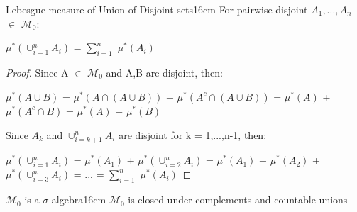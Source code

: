     \vspace{0.5cm}



    \begin{wtheorem}{Lebesgue measure of Union of Disjoint sets}{16cm}
        For pairwise disjoint $A_1,...,A_n$ $\in$ $\mathcal{M}_0$:

        \hspace{0.5cm}
        $\mu^*(\cup_{i=1}^n A_i)$ = $\sum_{i=1}^n$ $\mu^*(A_i)$
    \end{wtheorem}

    \begin{proof}
        Since A $\in$ $\mathcal{M}_0$ and A,B are disjoint, then:

        \hspace{0.5cm}
        $\mu^*(A \cup B)$
        = $\mu^*(A \cap (A \cup B))$ + $\mu^*(A^c \cap (A \cup B))$
        = $\mu^*(A)$ + $\mu^*(A^c \cap B)$
        = $\mu^*(A)$ + $\mu^*(B)$

        Since $A_k$ and $\cup_{i=k+1}^n A_i$ are disjoint
        for k = 1,...,n-1, then:

        \hspace{0.5cm}
        $\mu^*(\cup_{i=1}^n A_i)$
        = $\mu^*(A_1)$ + $\mu^*(\cup_{i=2}^n A_i)$ 
        = $\mu^*(A_1)$ + $\mu^*(A_2)$ + $\mu^*(\cup_{i=3}^n A_i)$
        = ...
        = $\sum_{i=1}^n$ $\mu^*(A_i)$
    \end{proof}

    \vspace{0.5cm}



    \begin{wtheorem}{$\mathcal{M}_0$ is a $\sigma$-algebra}{16cm}
        $\mathcal{M}_0$ is closed under complements and countable unions
    \end{wtheorem}

